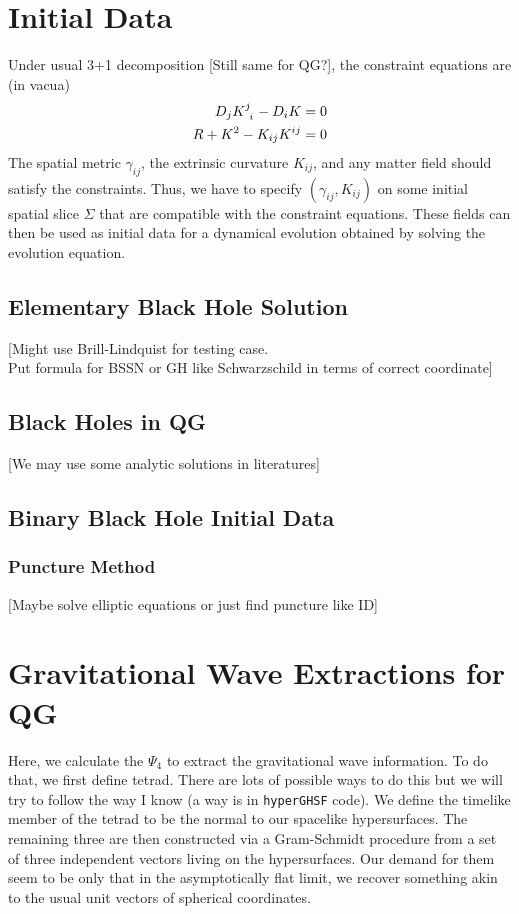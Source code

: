 \documentclass[a4paper,oneside,openany,11pt]{memoir}
\numberwithin{equation}{section} %
\newcommand{\NOTE}[1]{{\color{blue}[#1]}}
\begin{document}
\section{Initial Data}
Under usual 3+1 decomposition \NOTE{Still same for QG?}, the constraint equations are (in vacua)
\begin{align}
D_j K\indices{^j_i} - D_i K &= 0 \\
R + K^2 - K_{ij} K^{ij} &= 0
\end{align}
The spatial metric $\gamma_{ij}$, the extrinsic curvature $K_{ij}$, and any matter field should 
satisfy the constraints. Thus, we have to specify $(\gamma_{ij}, K_{ij})$ on some initial 
spatial slice $\Sigma$ that are compatible with the constraint equations. These fields can 
then be used as initial data for a dynamical evolution obtained by solving the evolution equation.

\subsection{Elementary Black Hole Solution}

\NOTE{Might use Brill-Lindquist for testing case. \\
Put formula for BSSN or GH like Schwarzschild in terms of correct coordinate}

\subsection{Black Holes in QG}

\NOTE{We may use some analytic solutions in literatures}

\subsection{Binary Black Hole Initial Data}
\subsubsection{Puncture Method}

\NOTE{Maybe solve elliptic equations or just find puncture like ID}

\section{Gravitational Wave Extractions for QG}
Here, we calculate the $\Psi_4$ to extract the gravitational wave information. To do that, we first define tetrad. 
There are lots of possible ways to do this but we will try to follow the way I know 
(a way is in \texttt{hyperGHSF} code). We define the timelike member of the tetrad to be the 
normal to our spacelike hypersurfaces. The remaining three are then constructed 
via a Gram-Schmidt procedure from a set of three independent vectors living on the 
hypersurfaces. Our demand for them seem to be only that in the asymptotically flat limit, 
we recover something akin to the usual unit vectors of spherical coordinates. 
\end{document}
